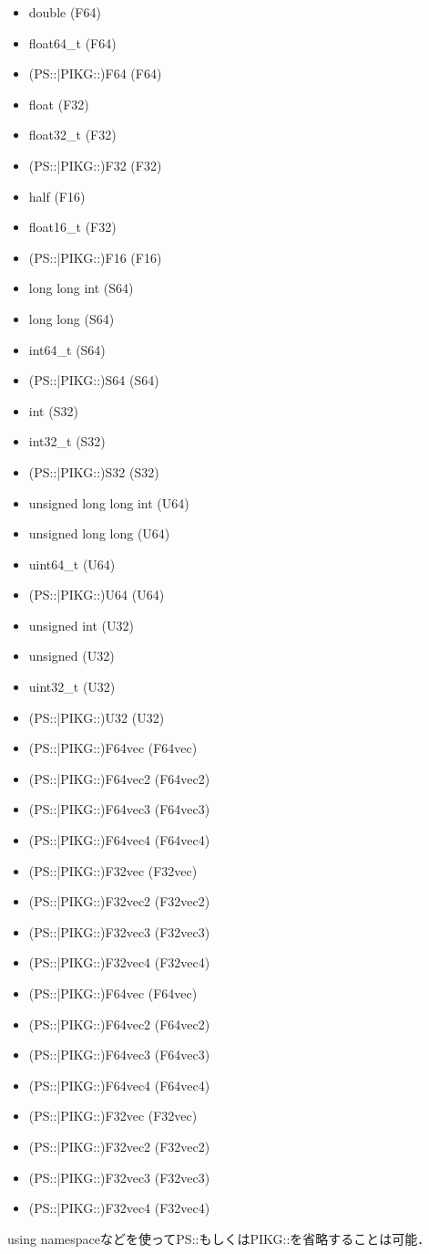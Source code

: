 \documentclass{article}
\begin{document}
 \begin{itemize}
  \item double (F64)
  \item float64\_t (F64)
  \item (PS::|PIKG::)F64 (F64)
  \item float (F32)
  \item float32\_t (F32)
  \item (PS::|PIKG::)F32 (F32)
  \item half (F16)
  \item float16\_t (F32)
  \item (PS::|PIKG::)F16 (F16)
  \item long long int (S64)
  \item long long (S64)
  \item int64\_t (S64)
  \item (PS::|PIKG::)S64 (S64)
  \item int (S32)
  \item int32\_t (S32)
  \item (PS::|PIKG::)S32 (S32)
  \item unsigned long long int (U64)
  \item unsigned long long (U64)
  \item uint64\_t (U64)
  \item (PS::|PIKG::)U64 (U64)
  \item unsigned int (U32)
  \item unsigned (U32)
  \item uint32\_t (U32)
  \item (PS::|PIKG::)U32 (U32)
  \item (PS::|PIKG::)F64vec (F64vec)
  \item (PS::|PIKG::)F64vec2 (F64vec2)
  \item (PS::|PIKG::)F64vec3 (F64vec3)
  \item (PS::|PIKG::)F64vec4 (F64vec4)
  \item (PS::|PIKG::)F32vec (F32vec)
  \item (PS::|PIKG::)F32vec2 (F32vec2)
  \item (PS::|PIKG::)F32vec3 (F32vec3)
  \item (PS::|PIKG::)F32vec4 (F32vec4)
  \item (PS::|PIKG::)F64vec (F64vec)
  \item (PS::|PIKG::)F64vec2 (F64vec2)
  \item (PS::|PIKG::)F64vec3 (F64vec3)
  \item (PS::|PIKG::)F64vec4 (F64vec4)
  \item (PS::|PIKG::)F32vec (F32vec)
  \item (PS::|PIKG::)F32vec2 (F32vec2)
  \item (PS::|PIKG::)F32vec3 (F32vec3)
  \item (PS::|PIKG::)F32vec4 (F32vec4)
 \end{itemize}
  using namespaceなどを使ってPS::もしくはPIKG::を省略することは可能．
\end{document}
